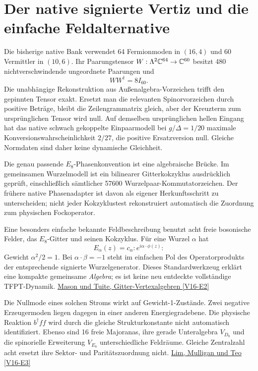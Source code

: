 \section{Der native signierte Vertiz und die einfache Feldalternative}
Die bisherige native Bank verwendet 64 Fermionmoden in $(16,4)$ und 60 Vermittler in $(10,6)$. Ihr Paarungstensor $W:\Lambda^2\mathbb C^{64}\to\mathbb C^{60}$ besitzt 480 nichtverschwindende ungeordnete Paarungen und
\begin{equation}
WW^\dagger=8I_{60}.
\end{equation}
Die unabhängige Rekonstruktion aus Außenalgebra-Vorzeichen trifft den gepinnten Tensor exakt. Ersetzt man die relevanten Spinorvorzeichen durch positive Beträge, bleibt die Zeilengrammatrix gleich, aber der Kreuzterm zum ursprünglichen Tensor wird null. Auf demselben ursprünglichen hellen Eingang hat das native schwach gekoppelte Einpaarmodell bei $g/\Delta=1/20$ maximale Konversionswahrscheinlichkeit $2/27$, die positive Ersatzversion null. Gleiche Normdaten sind daher keine dynamische Gleichheit.

Die genau passende $E_8$-Phasenkonvention ist eine algebraische Brücke. Im gemeinsamen Wurzelmodell ist ein bilinearer Gitterkokzyklus ausdrücklich geprüft, einschließlich sämtlicher 57600 Wurzelpaar-Kommutatorzeichen. Der frühere native Phasenadapter ist davon als eigener Herkunftsschritt zu unterscheiden; nicht jeder Kokzyklustest rekonstruiert automatisch die Zuordnung zum physischen Fockoperator.

Eine besonders einfache bekannte Feldbeschreibung benutzt acht freie bosonische Felder, das $E_8$-Gitter und seinen Kokzyklus. Für eine Wurzel $\alpha$ hat
\begin{equation}
E_\alpha(z)=c_\alpha :e^{i\alpha\cdot\phi(z)}:
\end{equation}
Gewicht $\alpha^2/2=1$. Bei $\alpha\cdot\beta=-1$ steht im einfachen Pol des Operatorprodukts der entsprechende signierte Wurzelgenerator. Dieses Standardwerkzeug erklärt eine kompakte gemeinsame \emph{Algebra}; es ist keine neu entdeckte vollständige TFPT-Dynamik. \href{https://arxiv.org/html/0912.0117v1}{Mason und Tuite, Gitter-Vertexalgebren [V16-E2]}

Die Nullmode eines solchen Stroms wirkt auf Gewicht-1-Zustände. Zwei negative Erzeugermoden liegen dagegen in einer anderen Energiegradebene. Die physische Reaktion $b^\dagger ff$ wird durch die gleiche Strukturkonstante nicht automatisch identifiziert. Ebenso sind 16 freie Majoranas, ihre gerade Unteralgebra $V_{D_8}$ und die spinorielle Erweiterung $V_{E_8}$ unterschiedliche Feldräume. Gleiche Zentralzahl acht ersetzt ihre Sektor- und Paritätszuordnung nicht. \href{https://arxiv.org/abs/2212.14559}{Lim, Mulligan und Teo [V16-E3]}

